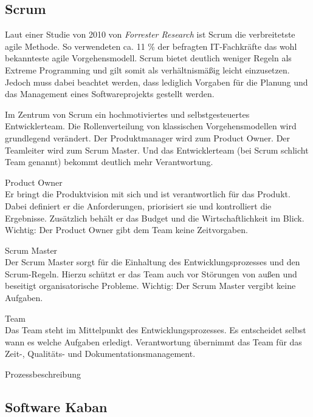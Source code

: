 \subsection{Scrum}
\label{ch:scrum}
Laut einer Studie von 2010 von \emph{Forrester Research} ist Scrum die verbreitetste agile Methode. So verwendeten ca. 11 \% der befragten IT-Fach\-kräfte das wohl bekannteste agile Vorgehensmodell. \cite{bib:ane} Scrum bietet deutlich weniger Regeln als Extreme Programming und gilt somit als verhältnismäßig leicht einzusetzen. Jedoch muss dabei beachtet werden, dass lediglich Vorgaben für die Planung und das Management eines Softwareprojekts gestellt werden. 

Im Zentrum von Scrum ein hochmotiviertes und selbstgesteuertes Entwicklerteam. Die Rollenverteilung von klassischen Vorgehensmodellen wird grundlegend verändert. Der Produktmanager wird zum Product Owner. Der Teamleiter wird zum Scrum Master. Und das Entwicklerteam (bei Scrum schlicht Team genannt) bekommt deutlich mehr Verantwortung.

\begin{description}
\item{Product Owner}\\
Er bringt die Produktvision mit sich und ist verantwortlich für das Produkt. Dabei definiert er die Anforderungen, priorisiert sie und kontrolliert die Ergebnisse. Zusätzlich behält er das Budget und die Wirtschaftlichkeit im Blick. Wichtig: Der Product Owner gibt dem Team keine Zeitvorgaben.

\item{Scrum Master}\\
Der Scrum Master sorgt für die Einhaltung des Entwicklungsprozesses und den Scrum-Regeln. Hierzu schützt er das Team auch vor Störungen von außen und beseitigt organisatorische Probleme. Wichtig: Der Scrum Master vergibt keine Aufgaben.

\item{Team}\\
Das Team steht im Mittelpunkt des Entwicklungsprozesses. Es entscheidet selbst wann es welche Aufgaben erledigt. Verantwortung übernimmt das Team für das Zeit-, Qualitäts- und Dokumentationsmanagement.
\end{description}

Prozessbeschreibung

\subsection{Software Kaban}

